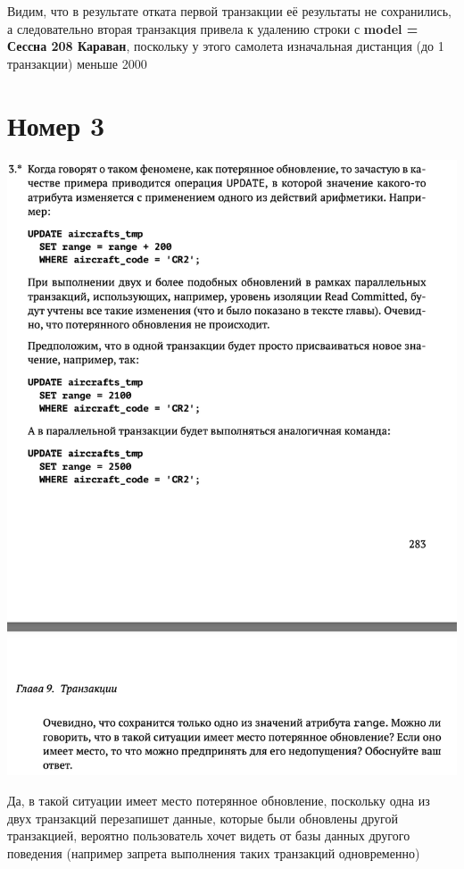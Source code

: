 \documentclass[a4paper,12pt]{article}
\begin{document}
Видим, что в результате отката первой транзакции её результаты не сохранились, а следовательно вторая транзакция привела к удалению строки с \textbf{model = Сессна 208 Караван}, поскольку у этого самолета изначальная дистанция (до 1 транзакции) меньше 2000
\clearpage
\section*{Номер 3}
\begin{center}
\includegraphics[scale=0.6]{t3.png}
\end{center}
Да, в такой ситуации имеет место потерянное обновление, поскольку одна из двух  транзакций перезапишет данные, которые были обновлены другой транзакцией, вероятно пользователь хочет видеть от базы данных другого поведения (например запрета выполнения таких транзакций одновременно)
\end{document}
